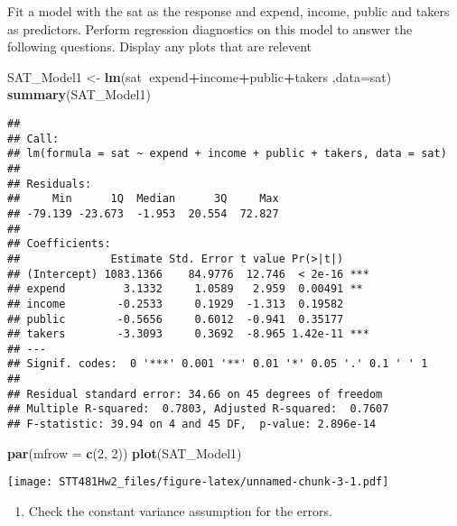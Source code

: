 \documentclass[]{article}
\newenvironment{Shaded}{\begin{snugshade}}{\end{snugshade}}
\newcommand{\KeywordTok}[1]{\textcolor[rgb]{0.13,0.29,0.53}{\textbf{#1}}}
\newcommand{\DataTypeTok}[1]{\textcolor[rgb]{0.13,0.29,0.53}{#1}}
\newcommand{\DecValTok}[1]{\textcolor[rgb]{0.00,0.00,0.81}{#1}}
\newcommand{\StringTok}[1]{\textcolor[rgb]{0.31,0.60,0.02}{#1}}
\newcommand{\OperatorTok}[1]{\textcolor[rgb]{0.81,0.36,0.00}{\textbf{#1}}}
\newcommand{\NormalTok}[1]{#1}
\providecommand{\tightlist}{%
  \setlength{\itemsep}{0pt}\setlength{\parskip}{0pt}}
\begin{document}
Fit a model with the sat as the response and expend, income, public and
takers as predictors. Perform regression diagnostics on this model to
answer the following questions. Display any plots that are relevent

\begin{Shaded}
\begin{Highlighting}[]
\NormalTok{SAT_Model1 <-}\StringTok{ }\KeywordTok{lm}\NormalTok{(sat}\OperatorTok{~}\NormalTok{expend}\OperatorTok{+}\NormalTok{income}\OperatorTok{+}\NormalTok{public}\OperatorTok{+}\NormalTok{takers ,}\DataTypeTok{data=}\NormalTok{sat)}
\KeywordTok{summary}\NormalTok{(SAT_Model1)}
\end{Highlighting}
\end{Shaded}

\begin{verbatim}
## 
## Call:
## lm(formula = sat ~ expend + income + public + takers, data = sat)
## 
## Residuals:
##     Min      1Q  Median      3Q     Max 
## -79.139 -23.673  -1.953  20.554  72.827 
## 
## Coefficients:
##              Estimate Std. Error t value Pr(>|t|)    
## (Intercept) 1083.1366    84.9776  12.746  < 2e-16 ***
## expend         3.1332     1.0589   2.959  0.00491 ** 
## income        -0.2533     0.1929  -1.313  0.19582    
## public        -0.5656     0.6012  -0.941  0.35177    
## takers        -3.3093     0.3692  -8.965 1.42e-11 ***
## ---
## Signif. codes:  0 '***' 0.001 '**' 0.01 '*' 0.05 '.' 0.1 ' ' 1
## 
## Residual standard error: 34.66 on 45 degrees of freedom
## Multiple R-squared:  0.7803, Adjusted R-squared:  0.7607 
## F-statistic: 39.94 on 4 and 45 DF,  p-value: 2.896e-14
\end{verbatim}

\begin{Shaded}
\begin{Highlighting}[]
\KeywordTok{par}\NormalTok{(}\DataTypeTok{mfrow =} \KeywordTok{c}\NormalTok{(}\DecValTok{2}\NormalTok{, }\DecValTok{2}\NormalTok{))}
\KeywordTok{plot}\NormalTok{(SAT_Model1)}
\end{Highlighting}
\end{Shaded}

\texttt{[image: STT481Hw2\_files/figure-latex/unnamed-chunk-3-1.pdf]}

\begin{enumerate}
\def\labelenumi{(\alph{enumi})}
\tightlist
\item
  Check the constant variance assumption for the errors.
\end{enumerate}
\end{document}
